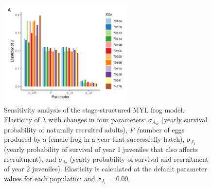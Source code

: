 \documentclass[9pt,twoside,lineno]{pnas-new}
\begin{document}
\begin{figure}

{\centering \includegraphics[width=0.60\textwidth]{figures/pop_viability_figures_for_supp.jpg}

}

\caption{\label{fig-viability-supp}Sensitivity analysis of the
stage-structured MYL frog model. Elasticity of \(\lambda\) with changes
in four parameters: \(\sigma_{A_R}\) (yearly survival probability of
naturally recruited adults), \emph{F (}number of eggs produced by a
female frog in a year that successfully hatch), \(\sigma_{J_1}\) (yearly
probability of survival of year 1 juveniles that also affects
recruitment), and \(\sigma_{J_2}\) (yearly probability of survival and
recruitment of year 2 juveniles). Elasticity is calculated at the
default parameter values for each population and \(\sigma_{J_1}\) =
0.09.}

\end{figure}\clearpage

\newpage
\end{document}
